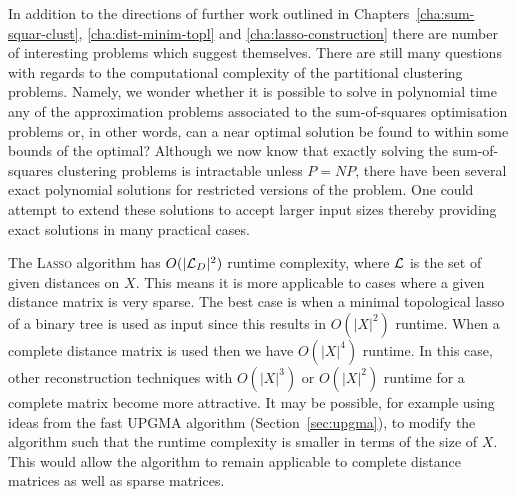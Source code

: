 In addition to the directions of further work outlined in
Chapters~\ref{cha:sum-squar-clust}, \ref{cha:dist-minim-topl} and
\ref{cha:lasso-construction} there are number of interesting problems which
suggest themselves.  There are still many questions with regards to the
computational complexity of the partitional clustering problems.  Namely, we
wonder whether it is possible to solve in polynomial time any of the
approximation problems associated to the sum-of-squares optimisation problems
or, in other words, can a near optimal solution be found to within some bounds
of the optimal?  Although we now know that exactly solving the sum-of-squares
clustering problems is intractable unless $P=NP$, there have been several
exact polynomial solutions for restricted versions of the problem.  One could
attempt to extend these solutions to accept larger input sizes thereby
providing exact solutions in many practical cases.

The \textsc{Lasso} algorithm has $O(|{\mathcal L}_D|^2)$ runtime complexity, where
${\mathcal L}$ is the set of given distances on $X$.  This means it is more applicable
to cases where a given distance matrix is very sparse.  The best case is when
a minimal topological lasso of a binary tree is used as input since this
results in $O(|X|^2)$ runtime.  When a complete distance matrix is used then
we have $O(|X|^4)$ runtime.  In this case, other reconstruction techniques
with $O(|X|^3)$ or $O(|X|^2)$ runtime for a complete matrix become more
attractive.  It may be possible, for example using ideas from the fast
\textsc{UPGMA} algorithm (Section~\ref{sec:upgma}), to modify the algorithm
such that the runtime complexity is smaller in terms of the size of $X$.  This
would allow the algorithm to remain applicable to complete distance matrices
as well as sparse matrices.

